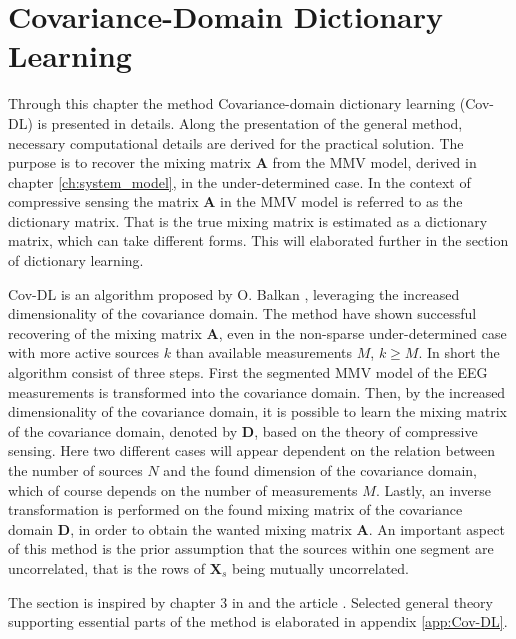 \chapter{Covariance-Domain Dictionary Learning}\label{ch:Cov-DL}
Through this chapter the method Covariance-domain dictionary learning (Cov-DL) is presented in details. Along the presentation of the general method, necessary computational details are derived for the practical solution.
The purpose is to recover the mixing matrix $\textbf{A}$ from the MMV model, derived in chapter \ref{ch:system_model}, in the under-determined case.   
In the context of compressive sensing the matrix $\textbf{A}$ in the MMV model is referred to as the dictionary matrix. That is the true mixing matrix is estimated as a dictionary matrix, which can take different forms. This will elaborated further in the section of dictionary learning.  

Cov-DL is an algorithm proposed by O. Balkan \cite{Balkan2015}, leveraging the increased dimensionality of the covariance domain. The method have shown successful recovering of the mixing matrix $\textbf{A}$, even in the non-sparse under-determined case with more active sources $k$ than available measurements $M$, $k \geq M$. 
In short the algorithm consist of three steps. 
First the segmented MMV model of the EEG measurements is transformed into the covariance domain. Then, by the increased dimensionality of the covariance domain, it is possible to learn the mixing matrix of the covariance domain, denoted by $\textbf{D}$, based on the theory of compressive sensing. Here two different cases will appear dependent on the relation between the number of sources $N$ and the found dimension of the covariance domain, which of course depends on the number of measurements $M$. Lastly, an inverse transformation is performed on the found mixing matrix of the covariance domain $\textbf{D}$, in order to obtain the wanted mixing matrix $\textbf{A}$. 
An important aspect of this method is the prior assumption that the sources within one segment are uncorrelated, that is the rows of $\textbf{X}_s$ being mutually uncorrelated. 

The section is inspired by chapter 3 in \cite{phd2015} and the article \cite{Balkan2015}. Selected general theory supporting essential parts of the method is elaborated in appendix \ref{app:Cov-DL}.


%